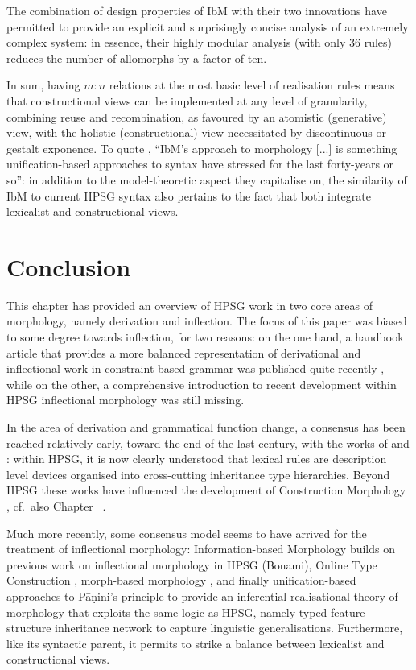 \documentclass[output=paper
                ,modfonts
                ,nonflat
	        ,collection
	        ,collectionchapter
	        ,collectiontoclongg
 	        ,biblatex
                ,babelshorthands
                ,newtxmath
                ,draftmode
                ,colorlinks, citecolor=brown
] {langscibook}
\begin{document}
{The combination of design properties of IbM with their two innovations
have permitted \citet{diaz:koenig:michelson:19} to provide an explicit
and surprisingly concise analysis of an extremely complex system: in
essence, their highly modular analysis (with only 36 rules) reduces the
number of allomorphs by a factor of ten.

\bigskip\noindent In sum, having $m:n$ relations at the most basic
level of realisation rules means that constructional views can be
implemented at any level of granularity, combining reuse and
recombination, as favoured by an atomistic (generative) view, with the
holistic (constructional) view necessitated by discontinuous or
gestalt exponence.  To quote \citet{diaz:koenig:michelson:19}, ``IbM’s
approach to morphology [...] is something unification-based approaches
to syntax have stressed for the last forty-years or so'': in addition
to the model-theoretic aspect they capitalise on, the similarity of
IbM to current HPSG syntax also pertains to the fact that both integrate
lexicalist and constructional views.

\section{Conclusion}

This chapter has provided an overview of HPSG work in two core areas
of morphology, namely derivation and inflection. The focus of this
paper was biased to some degree towards inflection, for two reasons:
on the one hand, a handbook article that provides a more balanced
representation of derivational and inflectional work in
constraint-based grammar was published quite recently
\citep{Bonami15b}, while on the other, a comprehensive introduction
to recent development within HPSG inflectional morphology was still
missing.

In the area of derivation and grammatical function change, a consensus
has been reached relatively early, toward the end of the last century,
with the works of \citet{Riehemann98} and \cite{Koenig99}:
within HPSG, it is now clearly understood that lexical rules are
description level devices organised into cross-cutting inheritance
type hierarchies. Beyond HPSG these works have influenced the
development of Construction Morphology \citep{Booij10}, cf.\ also
Chapter ~. 

Much more recently, some consensus model seems to have arrived for the
treatment of inflectional morphology: Information-based Morphology
\citep{Crysmann:Bonami:2016,Crysmann:14:OUP} builds on previous work on
inflectional morphology in HPSG (Bonami), Online Type Construction
\citep{Koenig99}, morph-based morphology \citep{crysmann_b03book}, and
finally unification-based approaches to Pāṇini's principle
\citep{Andrews90,Erjavec94,Koenig99} to provide an
inferential-realisational theory of morphology that exploits the same
logic as HPSG, namely typed feature structure inheritance network to
capture linguistic generalisations. Furthermore, like its syntactic
parent, it permits to strike a balance between lexicalist and
constructional views.


}


\printbibliography[heading=subbibliography,notkeyword=this]
\end{document}
